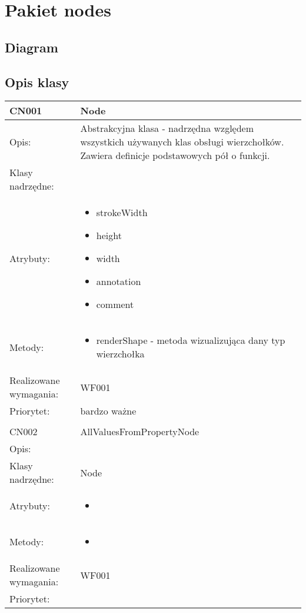 \documentclass[a4paper,10pt]{article}
\begin{document}
\section{Pakiet nodes}

\subsection{Diagram}

\subsection{Opis klasy}

\begin{center}
 


\begin{longtable}{|m{3cm}|m{9cm}|} \hline

CN001 & Node \\ \hline
Opis: & Abstrakcyjna klasa - nadrzędna względem wszystkich używanych klas obsługi wierzchołków. Zawiera definicje podstawowych pół o funkcji.    \\ \hline
Klasy nadrzędne: &     \\ \hline
Atrybuty: & \begin{itemize}
 \item strokeWidth
 \item height
 \item width
 \item annotation
 \item comment 
\end{itemize}
 \\ \hline
Metody: & \begin{itemize}
 \item renderShape - metoda wizualizująca dany typ wierzchołka
\end{itemize}
  \\ \hline
Realizowane wymagania: & WF001 \\ \hline
Priorytet: & bardzo ważne  \\ \hline

\multicolumn{2}{c}{} \\
 \hline

CN002 & AllValuesFromPropertyNode \\ \hline
Opis: &     \\ \hline
Klasy nadrzędne: & Node     \\ \hline
Atrybuty: & \begin{itemize}
 \item 
\end{itemize}
 \\ \hline
Metody: & \begin{itemize}
 \item 
\end{itemize}
  \\ \hline
Realizowane wymagania: & WF001 \\ \hline
Priorytet: &  \\ \hline


\end{longtable}
\end{center}
\end{document}
